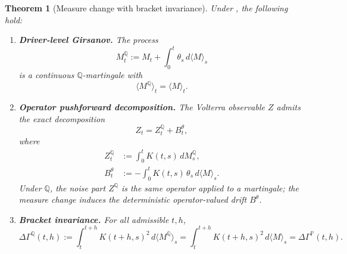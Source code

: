\documentclass[11pt]{article}
\theoremstyle{plain}
\newtheorem{theorem}{Theorem}[section]
\theoremstyle{definition}
\theoremstyle{remark}
\newcommand{\PP}{\mathbb{P}}
\newcommand{\QQ}{\mathbb{Q}}
\newcommand{\dGamma}{\Delta\Gamma}
\newcommand{\bracket}[1]{\langle #1 \rangle}
\begin{document}
\begin{theorem}[Measure change with bracket invariance]\label{thm:girsanov-main}
Under , the following hold:

\begin{enumerate}[label=(\arabic*)]
\item \textbf{Driver-level Girsanov.} The process
\begin{equation}\label{eq:MQ-def}
M_t^{\QQ} := M_t + \int_0^t \theta_s\,d\bracket{M}_s
\end{equation}
is a continuous $\QQ$-martingale with
\begin{equation}\label{eq:bracket-preserved}
\bracket{M^{\QQ}}_t = \bracket{M}_t.
\end{equation}

\item \textbf{Operator pushforward decomposition.} The Volterra observable
$Z$ admits the exact decomposition
\begin{equation}\label{eq:Z-decomp}
Z_t = Z_t^{\QQ} + B_t^\theta,
\end{equation}
where
\begin{align}
Z_t^{\QQ} &:= \int_0^t K(t,s)\,dM_s^{\QQ}, \label{eq:ZQ-def} \\
B_t^\theta &:= -\int_0^t K(t,s)\,\theta_s\,d\bracket{M}_s. \label{eq:Btheta-def}
\end{align}
Under $\QQ$, the noise part $Z^{\QQ}$ is the same operator applied to a
martingale; the measure change induces the deterministic operator-valued
drift $B^\theta$.

\item \textbf{Bracket invariance.} For all admissible $t, h$,
\begin{equation}\label{eq:DG-invariance}
\dGamma^{\QQ}(t,h) := \int_t^{t+h} K(t+h,s)^2\,d\bracket{M^{\QQ}}_s
= \int_t^{t+h} K(t+h,s)^2\,d\bracket{M}_s = \dGamma^{\PP}(t,h).
\end{equation}
\end{enumerate}
\end{theorem}
\end{document}

